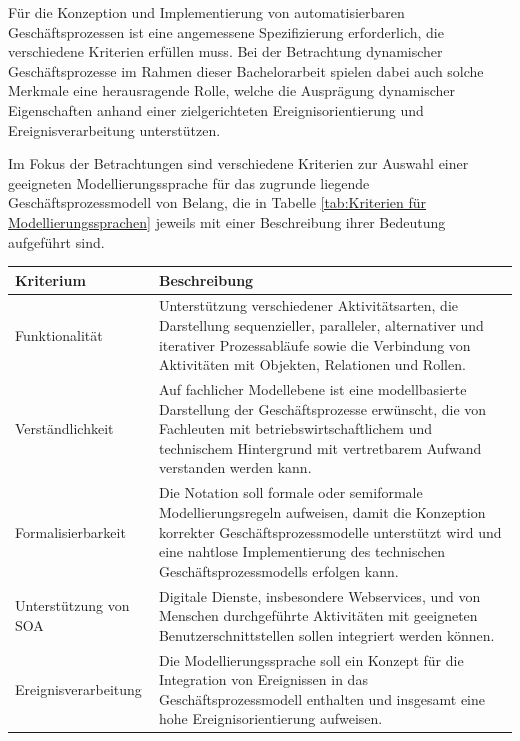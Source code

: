 Für die Konzeption und Implementierung von automatisierbaren Geschäftsprozessen ist eine angemessene Spezifizierung erforderlich, die verschiedene Kriterien erfüllen muss.
Bei der Betrachtung dynamischer Geschäftsprozesse im Rahmen dieser Bachelorarbeit spielen dabei auch solche Merkmale eine herausragende Rolle, welche die Ausprägung dynamischer Eigenschaften anhand einer zielgerichteten Ereignisorientierung und Ereignisverarbeitung unterstützen. 

Im Fokus der Betrachtungen sind verschiedene Kriterien zur Auswahl einer geeigneten Modellierungssprache für das zugrunde liegende Geschäftsprozessmodell von Belang, die in Tabelle \ref{tab:Kriterien für Modellierungssprachen} jeweils mit einer Beschreibung ihrer Bedeutung aufgeführt sind.

\begin{table}[H]
	\centering
	\begin{tabularx}{\textwidth}{l X} 
		\toprule
		\textbf{Kriterium}  &   
		\textbf{Beschreibung}  \\ 
		\toprule
		Funktionalität &   
		Unterstützung verschiedener Aktivitätsarten, die Darstellung sequenzieller, paralleler, alternativer und iterativer Prozessabläufe sowie die Verbindung von Aktivitäten mit Objekten, Relationen und Rollen. \cite{Funk.2010b} \\  \cmidrule(r){1-1} \cmidrule(r){2-2}
		
		Verständlichkeit &   
		Auf fachlicher Modellebene ist eine modellbasierte Darstellung der Geschäftsprozesse erwünscht, die von Fachleuten mit betriebswirtschaftlichem und technischem Hintergrund mit vertretbarem Aufwand verstanden werden kann. \\ \cmidrule(r){1-1} \cmidrule(r){2-2}
		
		Formalisierbarkeit &   
		Die Notation soll formale oder semiformale Modellierungsregeln aufweisen, damit die Konzeption korrekter Geschäftsprozessmodelle unterstützt wird und eine nahtlose Implementierung des technischen Geschäftsprozessmodells erfolgen kann. \cite{Becker.2012}  \\ \cmidrule(r){1-1} \cmidrule(r){2-2}
		
		Unterstützung von \ac{SOA} &   
		Digitale Dienste, insbesondere Webservices, und von Menschen durchgeführte Aktivitäten mit geeigneten Benutzerschnittstellen sollen integriert werden können.  \\ \cmidrule(r){1-1} \cmidrule(r){2-2}
		
		Ereignisverarbeitung &   
		Die Modellierungssprache soll ein Konzept für die Integration von Ereignissen in das Geschäftsprozessmodell enthalten und insgesamt eine hohe Ereignisorientierung aufweisen.   \\ \cmidrule(r){1-1} \cmidrule(r){2-2}
		

\end{tabularx}
\end{table}
